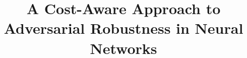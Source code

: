 \documentclass[conference]{IEEEtran}
\begin{document}
\title{A Cost-Aware Approach to Adversarial Robustness in Neural Networks}

\author{}

\maketitle
\end{document}

